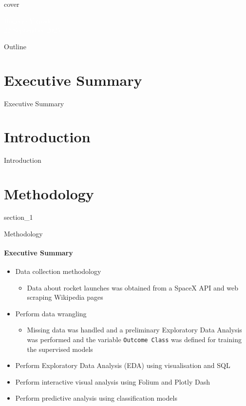 {
{cover}
\begin{frame}
    \vspace{5cm}
    \textcolor{white}{Rogério Yamada \\ 22 September 2025}
\end{frame}
}

\begin{frame}{Outline}
    \tableofcontents
\end{frame}

\section{Executive Summary}

\begin{frame}{Executive Summary}

\end{frame}

\section{Introduction}

\begin{frame}{Introduction}

\end{frame}

\section{Methodology}

{
{section_1}
\begin{frame}[plain]
\end{frame}
}

\begin{frame}{Methodology}
    \framesubtitle{Executive Summary}
    \begin{itemize}
        \item Data collection methodology
            \begin{itemize}
                \item Data about rocket launches was obtained from a SpaceX API and web scraping Wikipedia pages
            \end{itemize}
        \item Perform data wrangling
            \begin{itemize}
                \item Missing data was handled and a preliminary Exploratory Data Analysis was performed and the variable \texttt{Outcome Class} was defined for training the supervised models
            \end{itemize}
        \item Perform Exploratory Data Analysis (EDA) using visualisation and SQL
        \item Perform interactive visual analysis using Folium and Plotly Dash
        \item Perform predictive analysis using classification models
    \end{itemize}
\end{frame}

